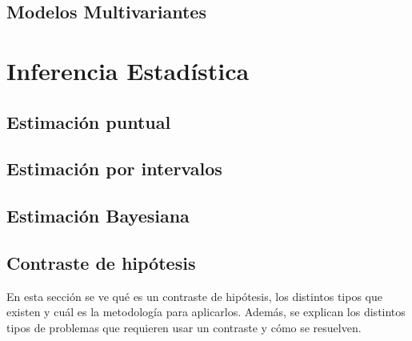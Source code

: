 \subsection{Modelos Multivariantes}
\section{Inferencia Estadística}
\subsection{Estimación puntual}
\subsection{Estimación por intervalos}
\subsection{Estimación Bayesiana}
\subsection{Contraste de hipótesis}
En esta sección se ve qué es un contraste de hipótesis, los distintos tipos que existen y cuál es la metodología para aplicarlos. Además, se explican los distintos tipos de problemas que requieren usar un contraste y cómo se resuelven.
